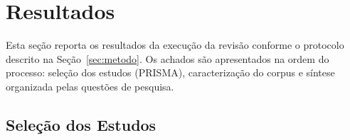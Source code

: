 %
%

\section{Resultados}
\label{sec:resultados}

Esta seção reporta os resultados da execução da revisão conforme o protocolo descrito na Seção~\ref{sec:metodo}. Os achados são apresentados na ordem do processo: seleção dos estudos (PRISMA), caracterização do corpus e síntese organizada pelas questões de pesquisa.

\subsection{Seleção dos Estudos}
\label{subsec:res_selecao}

